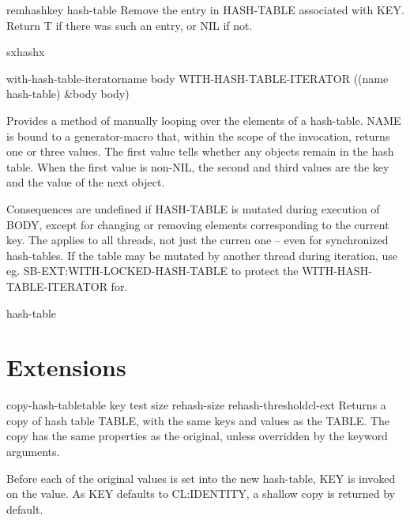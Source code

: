 \begin{function}{remhash}{key hash-table}{}{}
  Remove the entry in HASH-TABLE associated with KEY. Return T if
there was such an entry, or NIL if not.
\end{function}

\begin{function}{sxhash}{x}{}{}
  
\end{function}

\begin{macro}{with-hash-table-iterator}{name \body body}{}{}
  WITH-HASH-TABLE-ITERATOR ((name hash-table) \&body body)

Provides a method of manually looping over the elements of a hash-table. NAME
is bound to a generator-macro that, within the scope of the invocation,
returns one or three values. The first value tells whether any objects remain
in the hash table. When the first value is non-NIL, the second and third
values are the key and the value of the next object.

Consequences are undefined if HASH-TABLE is mutated during execution of BODY,
except for changing or removing elements corresponding to the current key. The
applies to all threads, not just the curren one -- even for synchronized
hash-tables. If the table may be mutated by another thread during iteration,
use eg. SB-EXT:WITH-LOCKED-HASH-TABLE to protect the WITH-HASH-TABLE-ITERATOR
for.
\end{macro}

\begin{class}{hash-table}{}{}{}
  
\end{class}

\section{Extensions}
\label{sec:extensions}

\begin{function}{copy-hash-table}{table \key key test size rehash-size rehash-threshold}{cl-ext}{}
  Returns a copy of hash table TABLE, with the same keys and values
as the TABLE. The copy has the same properties as the original, unless
overridden by the keyword arguments.

Before each of the original values is set into the new hash-table, KEY
is invoked on the value. As KEY defaults to CL:IDENTITY, a shallow
copy is returned by default.
\end{function}

